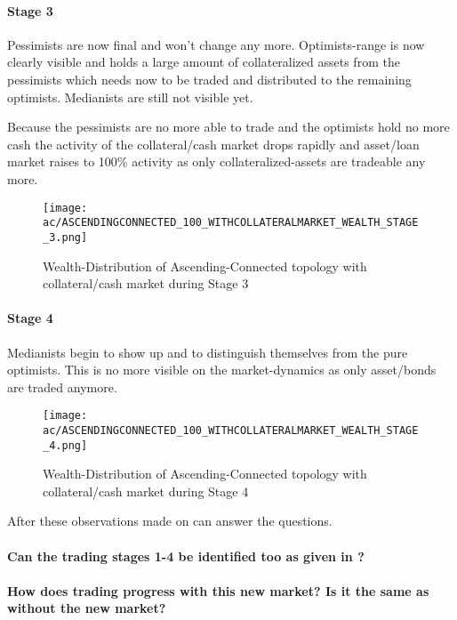\documentclass[Bachelorarbeit.tex]{subfiles}
\begin{document}
\paragraph{Stage 3}
Pessimists are now final and won't change any more. Optimists-range is now clearly visible and holds a large amount of collateralized assets from the pessimists which needs now to be traded and distributed to the remaining optimists. Medianists are still not visible yet.

\medskip

Because the pessimists are no more able to trade and the optimists hold no more cash the activity of the collateral/cash market drops rapidly and asset/loan market raises to 100\% activity as only collateralized-assets are tradeable any more.
		
\begin{figure}[H]
	\centering
  \texttt{[image: ac/ASCENDINGCONNECTED\_100\_WITHCOLLATERALMARKET\_WEALTH\_STAGE\_3.png]}
  	\caption{Wealth-Distribution of Ascending-Connected topology with collateral/cash market during Stage 3}
	\label{fig:wealth_ASCENDINGCONNECTED_100_WITHCOLLATERALMARKET_WEALTH_STAGE_3}
\end{figure}

\paragraph{Stage 4}
Medianists begin to show up and to distinguish themselves from the pure optimists. This is no more visible on the market-dynamics as only asset/bonds are traded anymore.
		
\begin{figure}[H]
	\centering
  \texttt{[image: ac/ASCENDINGCONNECTED\_100\_WITHCOLLATERALMARKET\_WEALTH\_STAGE\_4.png]}
  	\caption{Wealth-Distribution of Ascending-Connected topology with collateral/cash market during Stage 4}
	\label{fig:wealth_ASCENDINGCONNECTED_100_WITHCOLLATERALMARKET_WEALTH_STAGE_4}
\end{figure}

After these observations made on can answer the questions.

\paragraph{Can the trading stages 1-4 be identified too as given in \cite{Breuer_2015}?}
\paragraph{How does trading progress with this new market? Is it the same as without the new market?}
\end{document}
